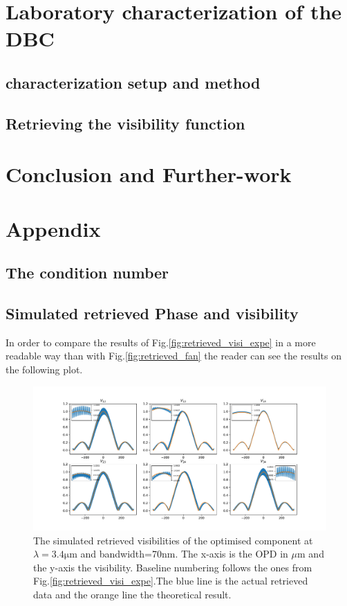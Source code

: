 \documentclass[a4paper,twoside,11pt]{article}
\makeatletter
\newcommand\backmatter{%
  \if@openright
    \clearpage
  \else
    \clearpage
  \fi
   }
\makeatother
\begin{document}
\section{Laboratory characterization of the DBC}

    \subsection{characterization setup and method}
    
    \subsection{Retrieving the visibility function}
    
    

\newpage   
\section*{Conclusion and Further-work}
	


\backmatter
\appendix
\section{Appendix}
    \subsection{The condition number}\label{an:cond}
    
\newpage
    \subsection{Simulated retrieved Phase and visibility}\label{an:retriev}
    In order to compare the results of Fig.\ref{fig:retrieved_visi_expe} in a more readable way than with Fig.\ref{fig:retrieved_fan} the reader can see the results on the following plot.
    \begin{figure}[htbp!]
     \centering
     \includegraphics[scale=.4]{../picture/retrieve_visi_simu.pdf}
     \caption{The simulated retrieved visibilities of the optimised component at $\lambda=3.4\si{\micro\meter}$ and bandwidth=70nm. The x-axis is the OPD in $\mu$m and the y-axis the visibility. Baseline numbering follows the ones from Fig.\ref{fig:retrieved_visi_expe}.The blue line is the actual retrieved data and the orange line the theoretical result.}
     \label{an:retrieved_visi_simu}
    \end{figure}
    
\end{document}
